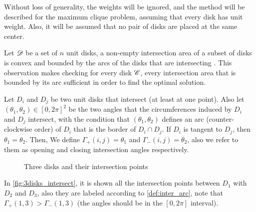 Without loss of generality, the weights will be ignored, and the method will be described for the maximum clique problem, assuming that every disk has unit weight. Also, it will be assumed that no pair of disks are placed at the same center.

Let $\mathscr{D}$ be a set of $n$ unit disks, a non-empty intersection area of a subset of disks is convex and bounded by the arcs of the disks that are intersecting \cite{inplace:2014}.
This observation makes checking for every disk $\mathscr{C}$, every intersection area that is bounded by its arc sufficient in order to find the optimal solution.

\begin{definicao}\label{def:inter_arc}
    Let $D_i$ and $D_j$ be two unit disks that intersect (at least at one point). Also let $(\theta_1, \theta_2) \in [0,2\pi]^2$ be the two angles that the circumferences induced by $D_i$ and $D_j$ intersect, with the condition that $(\theta_1,\theta_2)$ defines an arc (counter-clockwise order) of $D_i$ that is the border of $D_i \cap D_j$. If $D_i$ is tangent to $D_j$, then $\theta_1=\theta_2$. Then, We define $\Gamma_+(i,j) = \theta_1$ and $\Gamma_-(i,j) = \theta_2$, also we refer to them as opening and closing intersection angles respectively.
\end{definicao}

\begin{figure}[H]
\centering

    \caption{Three disks and their intersection points}
    
    \fautor
    \label{fig:3disks_intersect}
\end{figure}

In \autoref{fig:3disks_intersect}, it is shown all the intersection points between $D_1$ with $D_2$ and $D_3$, also they are labeled according to \autoref{def:inter_arc}, note that $\Gamma_+(1,3) > \Gamma_-(1,3)$ (the angles should be in the $[0,2\pi]$ interval).

